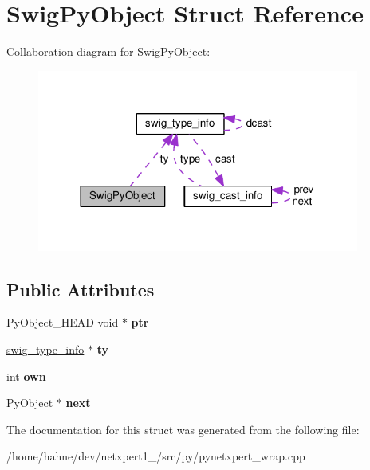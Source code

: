 \hypertarget{structSwigPyObject}{}\section{Swig\+Py\+Object Struct Reference}
\label{structSwigPyObject}


Collaboration diagram for Swig\+Py\+Object\+:\nopagebreak
\begin{figure}[H]
\begin{center}
\leavevmode
\includegraphics[width=300pt]{structSwigPyObject__coll__graph}
\end{center}
\end{figure}
\subsection*{Public Attributes}
\begin{DoxyCompactItemize}
\item 
Py\+Object\+\_\+\+H\+E\+AD void $\ast$ {\bfseries ptr}\hypertarget{structSwigPyObject_a41b1d569a8ba4fa9b1d87579c144891b}{}\label{structSwigPyObject_a41b1d569a8ba4fa9b1d87579c144891b}

\item 
\hyperlink{structswig__type__info}{swig\+\_\+type\+\_\+info} $\ast$ {\bfseries ty}\hypertarget{structSwigPyObject_a510b5a6f66a8a33c0a54c3eeb83e5ba5}{}\label{structSwigPyObject_a510b5a6f66a8a33c0a54c3eeb83e5ba5}

\item 
int {\bfseries own}\hypertarget{structSwigPyObject_a83cb6489fb1b171467f06c091ae6f283}{}\label{structSwigPyObject_a83cb6489fb1b171467f06c091ae6f283}

\item 
Py\+Object $\ast$ {\bfseries next}\hypertarget{structSwigPyObject_af7b93d7ae49a6f3bdf6511043fe8e839}{}\label{structSwigPyObject_af7b93d7ae49a6f3bdf6511043fe8e839}

\end{DoxyCompactItemize}


The documentation for this struct was generated from the following file\+:\begin{DoxyCompactItemize}
\item 
/home/hahne/dev/netxpert1\+\_/src/py/pynetxpert\+\_\+wrap.\+cpp\end{DoxyCompactItemize}
